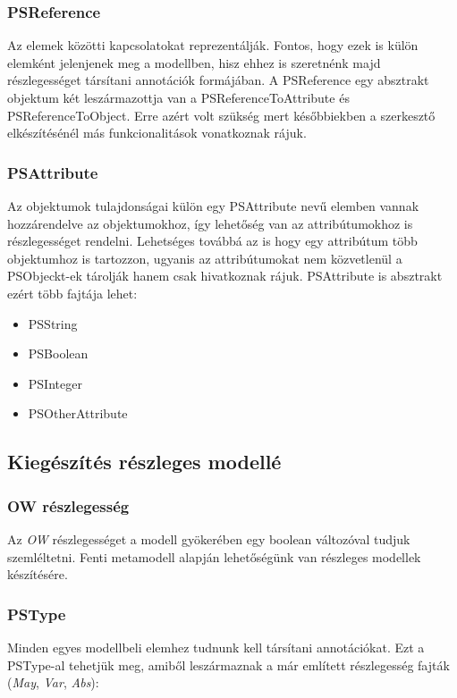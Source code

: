 \subsubsection{PSReference}
 Az elemek közötti kapcsolatokat reprezentálják. Fontos, hogy ezek is külön elemként jelenjenek meg a modellben, hisz ehhez is szeretnénk majd részlegességet társítani annotációk formájában. A PSReference egy absztrakt objektum két leszármazottja van a  PSReferenceToAttribute és PSReferenceToObject. Erre azért volt szükség mert későbbiekben a szerkesztő elkészítésénél más funkcionalitások vonatkoznak rájuk. 

\subsubsection{PSAttribute}
Az objektumok tulajdonságai külön egy PSAttribute nevű elemben vannak hozzárendelve az objektumokhoz, így lehetőség van az attribútumokhoz is részlegességet rendelni. Lehetséges továbbá az is hogy egy attribútum több objektumhoz is tartozzon, ugyanis az attribútumokat nem közvetlenül a PSObjeckt-ek tárolják hanem csak hivatkoznak rájuk. PSAttribute is absztrakt ezért több fajtája lehet:

\begin{itemize}  
	\item PSString
	\item PSBoolean
	\item PSInteger
	\item PSOtherAttribute 
\end{itemize}


\subsection{Kiegészítés részleges modellé}

\subsubsection{OW részlegesség}
Az \textit{OW} részlegességet a modell gyökerében egy boolean változóval tudjuk szemléltetni. Fenti metamodell alapján lehetőségünk van részleges modellek készítésére.

\subsubsection{PSType}
Minden egyes modellbeli elemhez tudnunk kell társítani annotációkat. Ezt a PSType-al tehetjük meg, amiből leszármaznak a már említett részlegesség fajták (\textit{May}, \textit{Var}, \textit{Abs}):

